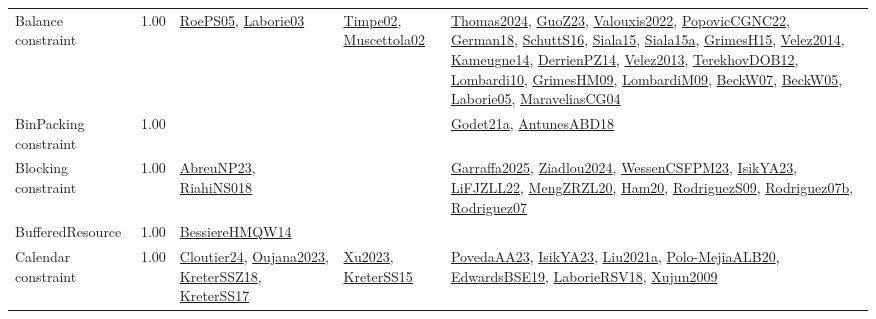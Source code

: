 {\begin{longtable}{p{3cm}r>{\raggedright\arraybackslash}p{6cm}>{\raggedright\arraybackslash}p{6cm}>{\raggedright\arraybackslash}p{8cm}}
\index{Balance constraint}\index{Constraints!Balance constraint}Balance constraint &  1.00 & \hyperref[detail:RoePS05]{RoePS05}, \hyperref[detail:Laborie03]{Laborie03} & \hyperref[detail:Timpe02]{Timpe02}, \hyperref[detail:Muscettola02]{Muscettola02} & \hyperref[detail:Thomas2024]{Thomas2024}, \hyperref[detail:GuoZ23]{GuoZ23}, \hyperref[detail:Valouxis2022]{Valouxis2022}, \hyperref[detail:PopovicCGNC22]{PopovicCGNC22}, \hyperref[detail:German18]{German18}, \hyperref[detail:SchuttS16]{SchuttS16}, \hyperref[detail:Siala15]{Siala15}, \hyperref[detail:Siala15a]{Siala15a}, \hyperref[detail:GrimesH15]{GrimesH15}, \hyperref[detail:Velez2014]{Velez2014}, \hyperref[detail:Kameugne14]{Kameugne14}, \hyperref[detail:DerrienPZ14]{DerrienPZ14}, \hyperref[detail:Velez2013]{Velez2013}, \hyperref[detail:TerekhovDOB12]{TerekhovDOB12}, \hyperref[detail:Lombardi10]{Lombardi10}, \hyperref[detail:GrimesHM09]{GrimesHM09}, \hyperref[detail:LombardiM09]{LombardiM09}, \hyperref[detail:BeckW07]{BeckW07}, \hyperref[detail:BeckW05]{BeckW05}, \hyperref[detail:Laborie05]{Laborie05}, \hyperref[detail:MaraveliasCG04]{MaraveliasCG04}\\
\index{BinPacking constraint}\index{Constraints!BinPacking constraint}BinPacking constraint &  1.00 &  &  & \hyperref[detail:Godet21a]{Godet21a}, \hyperref[detail:AntunesABD18]{AntunesABD18}\\
\index{Blocking constraint}\index{Constraints!Blocking constraint}Blocking constraint &  1.00 & \hyperref[detail:AbreuNP23]{AbreuNP23}, \hyperref[detail:RiahiNS018]{RiahiNS018} &  & \hyperref[detail:Garraffa2025]{Garraffa2025}, \hyperref[detail:Ziadlou2024]{Ziadlou2024}, \hyperref[detail:WessenCSFPM23]{WessenCSFPM23}, \hyperref[detail:IsikYA23]{IsikYA23}, \hyperref[detail:LiFJZLL22]{LiFJZLL22}, \hyperref[detail:MengZRZL20]{MengZRZL20}, \hyperref[detail:Ham20]{Ham20}, \hyperref[detail:RodriguezS09]{RodriguezS09}, \hyperref[detail:Rodriguez07b]{Rodriguez07b}, \hyperref[detail:Rodriguez07]{Rodriguez07}\\
\index{BufferedResource}\index{Constraints!BufferedResource}BufferedResource &  1.00 & \hyperref[detail:BessiereHMQW14]{BessiereHMQW14} &  & \\
\index{Calendar constraint}\index{Constraints!Calendar constraint}Calendar constraint &  1.00 & \hyperref[detail:Cloutier24]{Cloutier24}, \hyperref[detail:Oujana2023]{Oujana2023}, \hyperref[detail:KreterSSZ18]{KreterSSZ18}, \hyperref[detail:KreterSS17]{KreterSS17} & \hyperref[detail:Xu2023]{Xu2023}, \hyperref[detail:KreterSS15]{KreterSS15} & \hyperref[detail:PovedaAA23]{PovedaAA23}, \hyperref[detail:IsikYA23]{IsikYA23}, \hyperref[detail:Liu2021a]{Liu2021a}, \hyperref[detail:Polo-MejiaALB20]{Polo-MejiaALB20}, \hyperref[detail:EdwardsBSE19]{EdwardsBSE19}, \hyperref[detail:LaborieRSV18]{LaborieRSV18}, \hyperref[detail:Xujun2009]{Xujun2009}\\

\end{longtable}}
